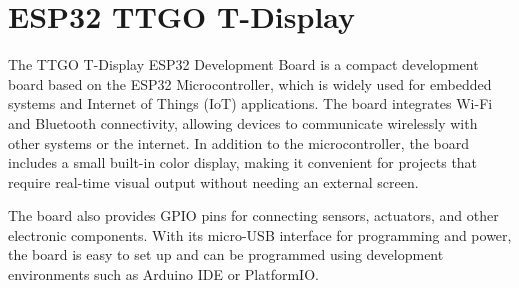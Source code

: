 \section{ESP32 TTGO T-Display}

The TTGO T-Display ESP32 Development Board is a compact development board based on the ESP32 Microcontroller, which is widely used for embedded systems and Internet of Things (IoT) applications. The board integrates Wi-Fi and Bluetooth connectivity, allowing devices to communicate wirelessly with other systems or the internet. In addition to the microcontroller, the board includes a small built-in color display, making it convenient for projects that require real-time visual output without needing an external screen.

The board also provides GPIO pins for connecting sensors, actuators, and other electronic components. With its micro-USB interface for programming and power, the board is easy to set up and can be programmed using development environments such as Arduino IDE or PlatformIO.